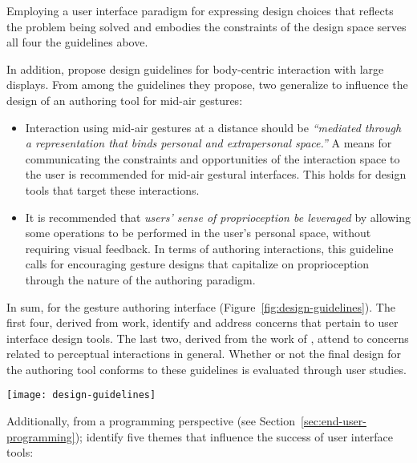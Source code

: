 Employing a user interface paradigm for expressing design choices that reflects the problem being solved and embodies the constraints of the design space \parencite{Norman:1993} serves all four the guidelines above.

In addition, \textcite{Shoemaker:2010} propose design guidelines for body-centric interaction with large displays. From among the guidelines they propose, two generalize to influence the design of an authoring tool for mid-air gestures:

\begin{itemize}
\item Interaction using mid-air gestures at a distance should be \emph{“mediated through a representation that binds personal and extrapersonal space.”} A means for communicating the constraints and opportunities of the interaction space to the user is recommended for mid-air gestural interfaces. This holds for design tools that target these interactions.
\item It is recommended that \emph{users’ sense of proprioception be leveraged} by allowing some operations to be performed in the user’s personal space, without requiring visual feedback. In terms of authoring interactions, this guideline calls for encouraging gesture designs that capitalize on proprioception through the nature of the authoring paradigm.
\end{itemize}

In sum,  for the gesture authoring interface (Figure~\ref{fig:design-guidelines}). The first four, derived from  work, identify and address concerns that pertain to user interface design tools. The last two, derived from the work of \textcite{Shoemaker:2010}, attend to concerns related to perceptual interactions in general. Whether or not the final design for the authoring tool conforms to these guidelines is evaluated through user studies.

\begin{SCfigure}[\sidecaptionrelwidth][ht]
\centering
\texttt{[image: design-guidelines]}
\caption{Guidelines derived from the literature formed the basis of the design rationale for a gesture authoring tool.}
\label{fig:design-guidelines}
\end{SCfigure}

Additionally, from a programming perspective (see Section~\ref{sec:end-user-programming}); \textcite{Myers:2000} identify five themes that influence the success of user interface tools:

